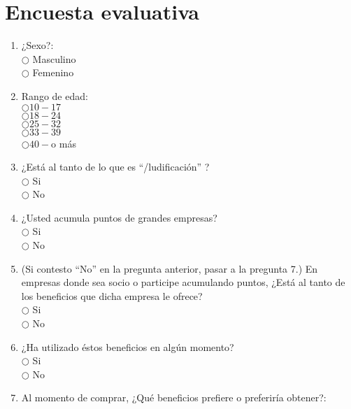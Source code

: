 \section{Encuesta evaluativa}

\begin{enumerate}

\item ¿Sexo?: \\

$\bigcirc$ Masculino \\
$\bigcirc$ Femenino

\item Rango de edad: \\

$\bigcirc 10 - 17$\\
$\bigcirc 18 - 24$\\
$\bigcirc 25 - 32$\\
$\bigcirc 33 - 39$\\
$\bigcirc 40 - $o más

\item ¿Está al tanto de lo que es ``{\gam}/ludificación'' ? \\

$\bigcirc$ Si \\
$\bigcirc$ No

\item ¿Usted acumula puntos de grandes empresas?\\

$\bigcirc$ Si \\
$\bigcirc$ No    

\item  (Si contesto ``No'' en la pregunta anterior, pasar a la pregunta 7.) En empresas donde sea socio o participe acumulando puntos, ¿Está al tanto de los beneficios que dicha empresa le ofrece?\\

$\bigcirc$ Si \\
$\bigcirc$ No

\item ¿Ha utilizado éstos beneficios en algún momento?\\

$\bigcirc$ Si \\
$\bigcirc$ No

\item Al momento de comprar, ¿Qué beneficios prefiere o preferiría obtener?:


\end{enumerate}
